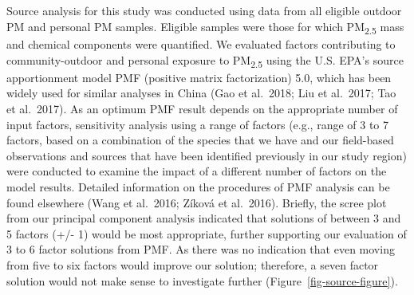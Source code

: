 \documentclass[
  letterpaper,
  DIV=11,
  numbers=noendperiod]{scrartcl}
\providecommand{\DIFaddtex}[1]{{\protect\color{blue}\uwave{#1}}} %
\providecommand{\DIFaddbegin}{} %
\providecommand{\DIFaddend}{} %
\providecommand{\DIFdelbegin}{} %
\providecommand{\DIFdelend}{} %
\providecommand{\DIFadd}[1]{\texorpdfstring{\DIFaddtex{#1}}{#1}} %
\newcommand{\DIFscaledelfig}{0.5}
\newlength{\DIFdelgraphicswidth} %
\newlength{\DIFdelgraphicsheight} %
\newcommand{\DIFaddincludegraphics}[2][]{{\color{blue}\fbox{\DIFOincludegraphics[#1]{#2}}}} %
\newcommand{\DIFdelincludegraphics}[2][]{%
\sbox{\DIFdelgraphicsbox}{\DIFOincludegraphics[#1]{#2}}%
\settoboxwidth{\DIFdelgraphicswidth}{\DIFdelgraphicsbox} %
\settoboxtotalheight{\DIFdelgraphicsheight}{\DIFdelgraphicsbox} %
\scalebox{\DIFscaledelfig}{%
\parbox[b]{\DIFdelgraphicswidth}{\usebox{\DIFdelgraphicsbox}\\[-\baselineskip] \rule{\DIFdelgraphicswidth}{0em}}\llap{\resizebox{\DIFdelgraphicswidth}{\DIFdelgraphicsheight}{%
\setlength{\unitlength}{\DIFdelgraphicswidth}%
\begin{picture}(1,1)%
\thicklines\linethickness{2pt} %
{\color[rgb]{1,0,0}\put(0,0){\framebox(1,1){}}}%
{\color[rgb]{1,0,0}\put(0,0){\line( 1,1){1}}}%
{\color[rgb]{1,0,0}\put(0,1){\line(1,-1){1}}}%
\end{picture}%
}\hspace*{3pt}}} %
} %
\DeclareRobustCommand{\DIFaddbegin}{\DIFOaddbegin \let\includegraphics\DIFaddincludegraphics} %
\DeclareRobustCommand{\DIFaddend}{\DIFOaddend \let\includegraphics\DIFOincludegraphics} %
\DeclareRobustCommand{\DIFdelbegin}{\DIFOdelbegin \let\includegraphics\DIFdelincludegraphics} %
\DeclareRobustCommand{\DIFdelend}{\DIFOaddend \let\includegraphics\DIFOincludegraphics} %
\begin{document}
\DIFdelbegin %
\DIFdelend \DIFaddbegin \subsection{\DIFadd{Aim 2: Source
contributions}}\label{aim-2-source-contributions}
\DIFaddend 

Source analysis for this study was conducted using data from all
eligible outdoor PM and personal PM samples. Eligible samples were those
for which PM\textsubscript{2.5} mass and chemical components were
quantified. We evaluated factors contributing to community-outdoor and
personal exposure to PM\textsubscript{2.5} using the U.S. EPA's source
apportionment model PMF (positive matrix factorization) 5.0, which has
been widely used for similar analyses in China (Gao et al.~2018; Liu et
al.~2017; Tao et al.~2017). As an optimum PMF result depends on the
appropriate number of input factors, sensitivity analysis using a range
of factors (e.g., range of 3 to 7 factors, based on a combination of the
species that we have and our field-based observations and sources that
have been identified previously in our study region) were conducted to
examine the impact of a different number of factors on the model
results. Detailed information on the procedures of PMF analysis can be
found elsewhere (Wang et al.~2016; Zíková et al.~2016). Briefly, the
scree plot from our principal component analysis indicated that
solutions of between 3 and 5 factors (+/- 1) would be most appropriate,
further supporting our evaluation of 3 to 6 factor solutions from PMF.
As there was no indication that even moving from five to six factors
would improve our solution; therefore, a seven factor solution would not
make sense to investigate further (Figure~\ref{fig-source-figure}).
\end{document}
